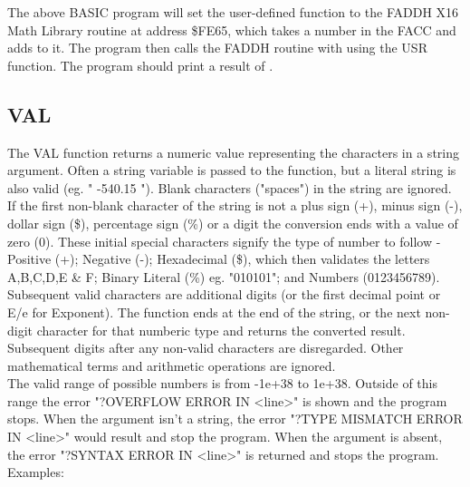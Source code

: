 The above BASIC program will set the user-defined function to the {\ttfamily
FADDH} X16 Math Library routine at address {\ttfamily \$FE65}, which takes a
number in the FACC and adds {} to it.  The program then calls the
{\ttfamily FADDH} routine with {} using the {\ttfamily USR}
function.  The program should print a result of {}.

\subsection{VAL}

The {\ttfamily VAL} function returns a numeric value representing the
characters in a string argument.  Often a string variable is passed to the
function, but a literal string is also valid (eg. "  -540.15 "). Blank
characters ("spaces") in the string are ignored.  If the first non-blank
character of the string is not a plus sign (+), minus sign (-), dollar sign
(\$), percentage sign (\%) or a digit the conversion ends with a value of zero
(0).  These initial special characters signify the type of number to follow -
Positive (+); Negative (-); Hexadecimal (\$), which then validates the letters
A,B,C,D,E \& F; Binary Literal (\%) eg. "010101"; and Numbers (0123456789).
Subsequent valid characters are additional digits (or the first decimal point
or E/e for Exponent).  The function ends at the end of the string, or the next
non-digit character for that numberic type and returns the converted result.
Subsequent digits after any non-valid characters are disregarded.  Other
mathematical terms and arithmetic operations are ignored.\\

The valid range of possible numbers is from -1e+38 to 1e+38. Outside of this
range the error "?OVERFLOW ERROR IN <line>" is shown and the program stops.
When the argument isn't a string, the error "?TYPE MISMATCH ERROR IN <line>"
would result and stop the program.  When the argument is absent, the error
"?SYNTAX ERROR IN <line>" is returned and stops the program.\\

Examples:\\


